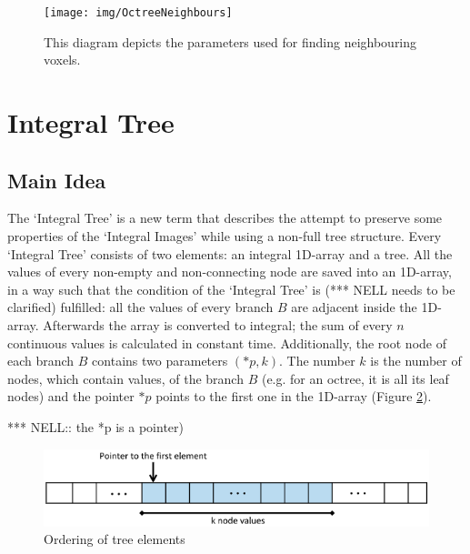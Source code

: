 \documentclass{subfiles}
\begin{document}
\begin{figure}[!htbp]
	\centering
	\texttt{[image: img/OctreeNeighbours]}
	\caption{This diagram depicts the parameters used for finding neighbouring voxels.}
	\label{fig:OctreeNeighbours}
\end{figure}


\newpage

\section{Integral Tree}\label{sec:ITopt}
\par 

\subsection{Main Idea }

\par The `Integral Tree' is a new term that describes the attempt to preserve some properties of the `Integral Images' while using a non-full tree structure. Every `Integral Tree' consists of two elements: an integral 1D-array and a tree. All the values of every non-empty and non-connecting node are saved into an 1D-array, in a way such that the condition of the `Integral Tree' is {\color{red} (*** NELL needs to be clarified) fulfilled}: all the values of every branch $B$ are adjacent inside the 1D-array. Afterwards the array is converted to integral; the sum of every $n$ continuous values is calculated in constant time. Additionally, the root node of each branch $B$ contains two parameters $(*p, k)$. The number $k$ is the number of nodes, which contain values, of the branch $B$ (e.g. for an octree, it is all its leaf nodes) and the pointer $*p$ points to the first one in the 1D-array (Figure \ref{fig:IntegralTreeMainIdea}).
\par {\color{red} *** NELL:: the *p is a pointer)}

\begin{figure}[!htbp]
	\centering
	\includegraphics[width=5.5in]{img/IntegralTreeMainIdea}
	\caption{Ordering of tree elements}
	\label{fig:IntegralTreeMainIdea}
\end{figure}
\end{document}
